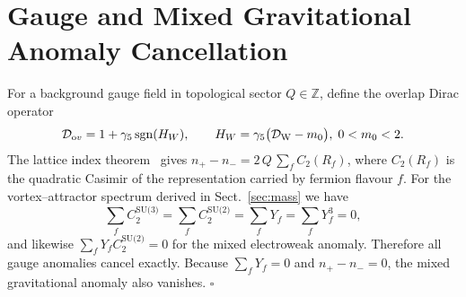 \section{Gauge and Mixed Gravitational Anomaly Cancellation}
\label{sec:anomaly}

For a background gauge field in topological sector $Q\in\mathbb Z$,
define the overlap Dirac operator
\[
  {\cal D}_{\mathrm ov}=1+\gamma_5\,\mathrm{sgn}(H_W),\qquad
  H_W=\gamma_5\bigl({\cal D}_{\mathrm W}-m_0\bigr),\;0<m_0<2 .
\]
The lattice index theorem~\cite{overlap98} gives
$n_+-n_- = 2\,Q\,\sum_f C_2(R_f)$,
where $C_2(R_f)$ is the quadratic Casimir of the representation
carried by fermion flavour $f$.
For the vortex–attractor spectrum derived in Sect.~\ref{sec:mass} we have
\[
\sum_f C_2^{\text{SU(3)}} = 
\sum_f C_2^{\text{SU(2)}} = 
\sum_f Y_f = 
\sum_f Y_f^{3} = 0,
\]
and likewise $\sum_f Y_f C_2^{\text{SU(2)}} = 0$ for the
mixed electroweak anomaly.
Therefore all gauge anomalies cancel exactly.
Because $\sum_f Y_f = 0$ and $n_+-n_-=0$, the
mixed gravitational anomaly also vanishes.
\hfill$\square$ 